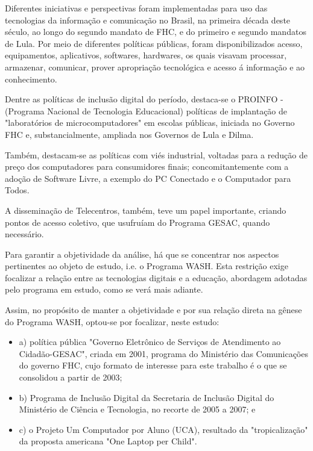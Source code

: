 Diferentes iniciativas e perspectivas foram implementadas para uso das tecnologias da informação e comunicação no Brasil, na primeira década deste século, ao longo do segundo mandato de FHC, e do primeiro e segundo mandatos de Lula. Por meio de diferentes políticas públicas, foram disponibilizados acesso, equipamentos, aplicativos, softwares, hardwares, os quais visavam processar, armazenar, comunicar, prover apropriação tecnológica e acesso á informação e ao conhecimento.

Dentre as políticas de inclusão digital do período, destaca-se o  PROINFO - (Programa Nacional de Tecnologia Educacional) políticas de implantação de "laboratórios de microcomputadores" em escolas públicas, iniciada no Governo FHC e, substancialmente, ampliada nos Governos de Lula e Dilma.

Também, destacam-se as políticas com viés industrial, voltadas para a redução de preço dos computadores para consumidores finais; concomitantemente com a adoção de Software Livre, a exemplo do PC Conectado e o Computador para Todos.

A disseminação de Telecentros, também, teve um papel importante, criando pontos de acesso coletivo, que usufruíam do Programa GESAC, quando necessário.

Para garantir a objetividade da análise, há que se concentrar nos aspectos pertinentes ao objeto de estudo, i.e. o Programa WASH. Esta restrição exige focalizar a relação entre as tecnologias digitais e a educação, abordagem adotadas pelo programa em estudo, como se verá mais adiante.

Assim, no propósito de manter a objetividade e por sua relação direta na gênese do Programa WASH, optou-se por focalizar, neste estudo:


\begin{itemize}
\item a) política pública "Governo Eletrônico de Serviços de Atendimento ao Cidadão-GESAC", criada em 2001, programa do Ministério das Comunicações do governo FHC, cujo formato de interesse para este trabalho é o que se consolidou a partir de 2003;

\item b) Programa de Inclusão Digital da Secretaria de Inclusão Digital do Ministério de Ciência e Tecnologia, no recorte de 2005 a 2007; e
\item c) o Projeto Um Computador por Aluno (UCA), resultado da "tropicalização" da proposta americana "One Laptop per Child".
\end{itemize}

